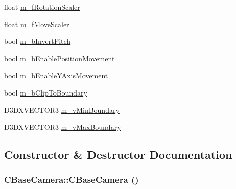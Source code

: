\begin{DoxyCompactItemize}
\item 
float \hyperlink{class_c_base_camera_a2faeeb72dd3ec59cb4bb05726341bca8}{m\_\-fRotationScaler}
\item 
float \hyperlink{class_c_base_camera_ac45d164a6908b70b436223a89d48f158}{m\_\-fMoveScaler}
\item 
bool \hyperlink{class_c_base_camera_a6d12cd53bc908e4da00a7c3581807598}{m\_\-bInvertPitch}
\item 
bool \hyperlink{class_c_base_camera_a59fae15ac67cb211049b17bf38672ac8}{m\_\-bEnablePositionMovement}
\item 
bool \hyperlink{class_c_base_camera_a2fbcc041572a057cfd03c27f157eaf08}{m\_\-bEnableYAxisMovement}
\item 
bool \hyperlink{class_c_base_camera_a1087c9e2eaf936be735df38f6f8719ad}{m\_\-bClipToBoundary}
\item 
D3DXVECTOR3 \hyperlink{class_c_base_camera_a63dd58475f7382d77ada28b763e7a422}{m\_\-vMinBoundary}
\item 
D3DXVECTOR3 \hyperlink{class_c_base_camera_a8f823201300bc646e232a82a4c5b6eea}{m\_\-vMaxBoundary}
\end{DoxyCompactItemize}


\subsection{Constructor \& Destructor Documentation}
\hypertarget{class_c_base_camera_a4f4eaa45a5d8632abb98b035219e6b82}{
\subsubsection[{CBaseCamera}]{\setlength{\rightskip}{0pt plus 5cm}CBaseCamera::CBaseCamera ()}}
\label{class_c_base_camera_a4f4eaa45a5d8632abb98b035219e6b82}


